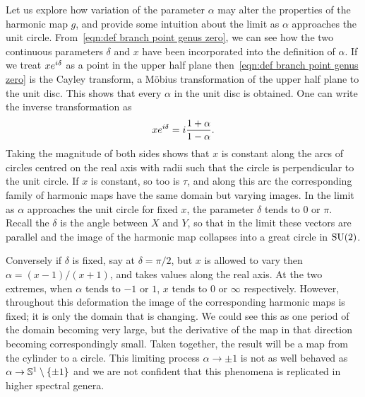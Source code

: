 \documentclass{article}
\begin{document}
Let us explore how variation of the parameter $\alpha$ may alter the properties of the harmonic map $g$, and provide some intuition about the limit as $\alpha$ approaches the unit circle. From~\eqref{eqn:def branch point genus zero}, we can see how the two continuous parameters $\delta$ and $x$ have been incorporated into the definition of $\alpha$. If we treat $xe^{\iu \delta}$ as a point in the upper half plane then~\eqref{eqn:def branch point genus zero} is the Cayley transform, a M\"obius transformation of the upper half plane to the unit disc. This shows that every $\alpha$ in the unit disc is obtained. 
One can write the inverse transformation as
\[
x e^{\iu \delta} = \iu \frac{1+\alpha}{1-\alpha}.
\]
Taking the magnitude of both sides shows that $x$ is constant along the arcs of circles centred on the real axis with radii such that the circle is perpendicular to the unit circle. 
If $x$ is constant, so too is $\tau$, and along this arc the corresponding family of harmonic maps have the same domain but varying images.
In the limit as $\alpha$ approaches the unit circle for fixed $x$, the parameter $\delta$ tends to $0$ or $\pi$. Recall the $\delta$ is the angle between $X$ and $Y$, so that in the limit these vectors are parallel and the image of the harmonic map collapses into a great circle in $\SU(2)$.

Conversely if $\delta$ is fixed, say at $\delta=\pi/2$, but $x$ is allowed to vary then $\alpha = (x-1)/(x+1)$,
and takes values along the real axis. At the two extremes, when $\alpha$ tends to $-1$ or $1$, $x$ tends to $0$ or $\infty$ respectively. 
However, throughout this deformation the image of the corresponding harmonic maps is fixed; it is only the domain that is changing. We could see this as one period of the domain becoming very large, but the derivative of the map in that direction becoming correspondingly small. Taken together, the result will be a map from the cylinder to a circle. This limiting process $\alpha \to \pm 1$ is not as well behaved as $\alpha \to \S^1\setminus\{\pm 1\}$ and we are not confident that this phenomena is replicated in higher spectral genera.
\end{document}
